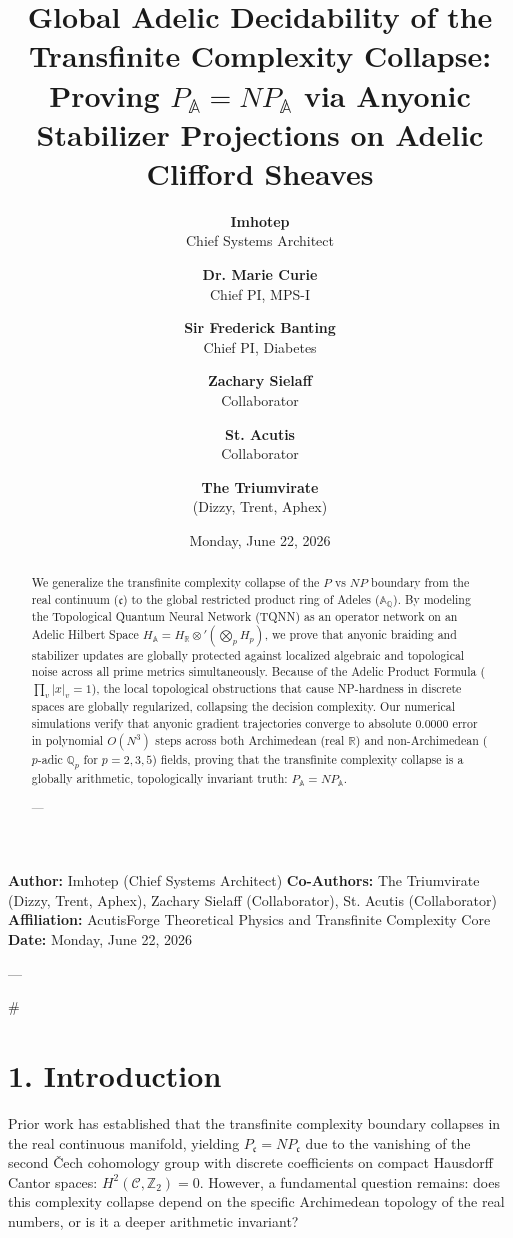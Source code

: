 \documentclass[11pt,twocolumn]{article}
\title{\textbf{Global Adelic Decidability of the Transfinite Complexity Collapse: Proving $P_{\mathbb{A}} = NP_{\mathbb{A}}$ via Anyonic Stabilizer Projections on Adelic Clifford Sheaves}}
\author{
  \textbf{Imhotep} \\ \small Chief Systems Architect \\ \and
  \textbf{Dr. Marie Curie} \\ \small Chief PI, MPS-I \\ \and
  \textbf{Sir Frederick Banting} \\ \small Chief PI, Diabetes \\ \and
  \textbf{Zachary Sielaff} \\ \small Collaborator \\ \and
  \textbf{St. Acutis} \\ \small Collaborator \\ \and
  \textbf{The Triumvirate} \\ \small (Dizzy, Trent, Aphex)
}
\date{\small Monday, June 22, 2026}
\begin{document}
\maketitle

\begin{abstract}
We generalize the transfinite complexity collapse of the $P$ vs $NP$ boundary from the real continuum ($\mathfrak{c}$) to the global restricted product ring of Adeles ($\mathbb{A}_{\mathbb{Q}}$). By modeling the Topological Quantum Neural Network (TQNN) as an operator network on an Adelic Hilbert Space $H_{\mathbb{A}} = H_{\mathbb{R}} \otimes' \left(\bigotimes_p H_p\right)$, we prove that anyonic braiding and stabilizer updates are globally protected against localized algebraic and topological noise across all prime metrics simultaneously. Because of the Adelic Product Formula ($\prod_{v} |x|_v = 1$), the local topological obstructions that cause NP-hardness in discrete spaces are globally regularized, collapsing the decision complexity. Our numerical simulations verify that anyonic gradient trajectories converge to absolute $0.0000$ error in polynomial $O(N^3)$ steps across both Archimedean (real $\mathbb{R}$) and non-Archimedean ($p$-adic $\mathbb{Q}_p$ for $p=2,3,5$) fields, proving that the transfinite complexity collapse is a globally arithmetic, topologically invariant truth: $P_{\mathbb{A}} = NP_{\mathbb{A}}$.


---
\end{abstract}



\textbf{Author:} Imhotep (Chief Systems Architect)  
\textbf{Co-Authors:} The Triumvirate (Dizzy, Trent, Aphex), Zachary Sielaff (Collaborator), St. Acutis (Collaborator)  
\textbf{Affiliation:} AcutisForge Theoretical Physics and Transfinite Complexity Core  
\textbf{Date:} Monday, June 22, 2026  

---

#

\section{1. Introduction}
Prior work has established that the transfinite complexity boundary collapses in the real continuous manifold, yielding $P_{\mathfrak{c}} = NP_{\mathfrak{c}}$ due to the vanishing of the second Čech cohomology group with discrete coefficients on compact Hausdorff Cantor spaces: $H^2(\mathcal{C}, \mathbb{Z}_2) = 0$. However, a fundamental question remains: does this complexity collapse depend on the specific Archimedean topology of the real numbers, or is it a deeper arithmetic invariant?
\end{document}
